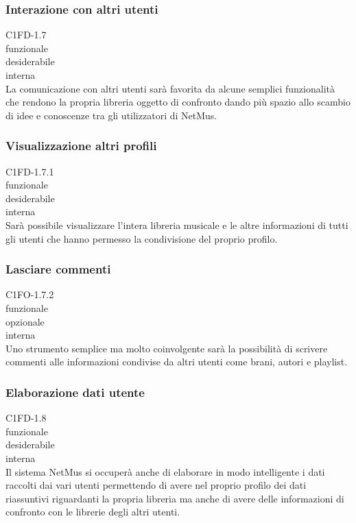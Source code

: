 \subsubsection*{Interazione con altri utenti}
 C1FD-1.7 \\
 funzionale \\
 desiderabile \\
 interna \\
La comunicazione con altri utenti sar\`a favorita da alcune semplici funzionalit\`a
che rendono la propria libreria oggetto di confronto dando pi\`u spazio
allo scambio di idee e conoscenze tra gli utilizzatori di NetMus.

\subsubsection*{Visualizzazione altri profili}
 C1FD-1.7.1 \\
 funzionale \\
 desiderabile \\
 interna \\
Sar\`a possibile visualizzare l'intera libreria musicale e le altre informazioni
di tutti gli utenti che hanno permesso la condivisione del proprio profilo.

\subsubsection*{Lasciare commenti}
 C1FO-1.7.2 \\
 funzionale \\
 opzionale \\
 interna \\
Uno strumento semplice ma molto coinvolgente sar\`a la possibilit\`a di scrivere
commenti alle informazioni condivise da altri utenti come brani, autori e
playlist.

\subsubsection*{Elaborazione dati utente}
 C1FD-1.8 \\
 funzionale \\
 desiderabile \\
 interna \\
Il sistema NetMus si occuper\`a anche di elaborare in modo intelligente i dati
raccolti dai vari utenti permettendo di avere nel proprio profilo dei dati
riassuntivi riguardanti la propria libreria ma anche di avere delle informazioni
di confronto con le librerie degli altri utenti.

